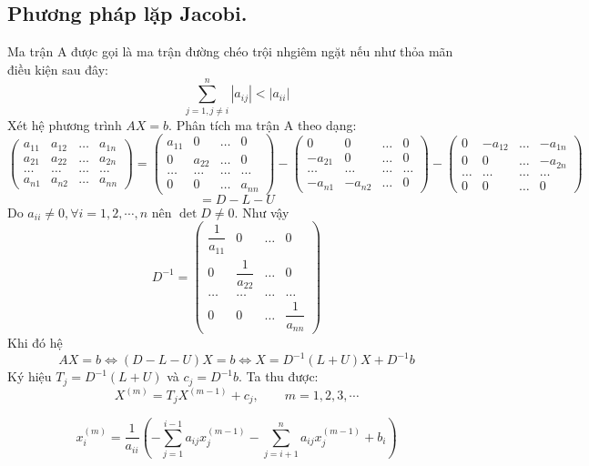 \documentclass[12pt, a4paper]{report}
\begin{document}
\subsection{Phương pháp lặp Jacobi.}
Ma trận A được gọi là ma trận đường chéo trội nhgiêm ngặt nếu như thỏa mãn điều kiện sau đây:
\[
    \displaystyle \sum_{j=1, j \neq i}^{n} | a_{ij} | < | a_{ii} |   
\]
Xét hệ phương trình $AX=b$. Phân tích ma trận A theo dạng:
\[
    \begin{pmatrix}
        a_{11} & a_{12} &  \dots  & a_{1n} \\
        a_{21} & a_{22} &  \dots  & a_{2n} \\
        \dots & \dots &  \dots & \dots\\
        a_{n1} & a_{n2} &  \dots  & a_{nn}
    \end{pmatrix} = \begin{pmatrix}
        a_{11} & 0 &  \dots  & 0 \\
        0 & a_{22} &  \dots  & 0 \\
        \dots & \dots &  \dots & \dots\\
        0 & 0 &  \dots  & a_{nn}
    \end{pmatrix} - \begin{pmatrix}
        0 & 0 &  \dots  & 0 \\
        -a_{21} & 0 &  \dots  & 0 \\
        \dots & \dots &  \dots & \dots\\
        -a_{n1} & -a_{n2} &  \dots  & 0
    \end{pmatrix} - \begin{pmatrix}
        0 & -a_{12} &  \dots  & -a_{1n} \\
        0 & 0 &  \dots  & -a_{2n} \\
        \dots & \dots &  \dots & \dots\\
        0 & 0 &  \dots  & 0
    \end{pmatrix}
\]
\[
    = D - L - U    
\]
Do $a_{ii} \neq 0, \forall i=1,2,\cdots,n$ nên $\det D \neq 0$. Như vậy
\[
    D^{-1} = \begin{pmatrix}
        \dfrac{1}{a_{11}} & 0 &  \dots  & 0 \\
        0 & \dfrac{1}{a_{22}} &  \dots  & 0 \\
        \dots & \dots &  \dots & \dots\\
        0 & 0 &  \dots  & \dfrac{1}{a_{nn}}
    \end{pmatrix}
\]
Khi đó hệ
\[
    AX=b \Longleftrightarrow (D-L-U)X = b \Longleftrightarrow X = D^{-1}(L+U)X + D^{-1}b
\]
Ký hiệu $T_j = D^{-1}(L+U) $ và $c_j = D^{-1}b$. Ta thu được:
\[
    X^{(m)} = T_j X^{(m-1)} + c_j, \qquad m=1,2,3,\cdots
\]
\begin{tcolorbox}[title=Dạng tường minh của công thức lặp Jacobi, titlebox=visible, colframe=red!75!black,colback=red!5!white,fonttitle=\bfseries]
    \[
        x^{(m)}_i = \dfrac{1}{a_{ii}} \left(  -\displaystyle \sum_{j=1}^{i-1}a_{ij}x^{(m-1)}_j - \displaystyle \sum_{j=i+1}^{n}a_{ij}x^{(m-1)}_j + b_i \right)
    \]
\end{tcolorbox}
\end{document}
